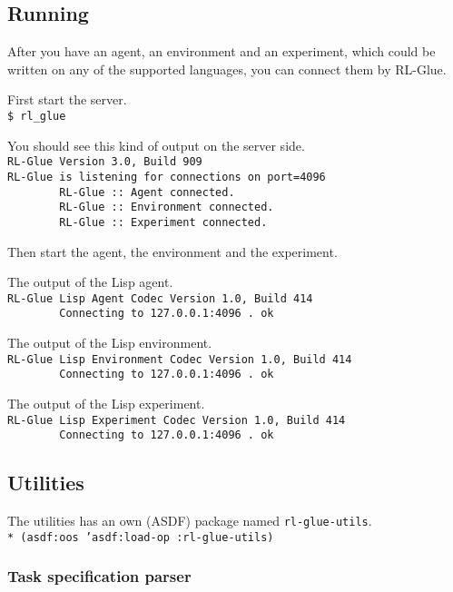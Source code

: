\documentclass[11pt,a4paper,dvipdfm]{article}
\newcommand{\prompttext}[1]{\texttt{#1}}
\newcommand{\shprompt}[1]{\prompttext{\$ #1}}
\newcommand{\lispprompt}[1]{\prompttext{* #1}}
\begin{document}
\subsection{Running}

After you have an agent, an environment and an experiment, which could be
written on any of the supported languages, you can connect them by RL-Glue.

First start the server. \\
\shprompt{rl\_glue}

You should see this kind of output on the server side. \\
\prompttext{RL-Glue Version 3.0, Build 909 \\
RL-Glue is listening for connections on port=4096 \\
\mbox{~~~~~~~~}RL-Glue ::~Agent connected. \\
\mbox{~~~~~~~~}RL-Glue ::~Environment connected. \\
\mbox{~~~~~~~~}RL-Glue ::~Experiment connected.}

Then start the agent, the environment and the experiment.

The output of the Lisp agent. \\
\prompttext{RL-Glue Lisp Agent Codec Version 1.0, Build 414 \\
\mbox{~~~~~~~~}Connecting to 127.0.0.1:4096 .~ok}

The output of the Lisp environment. \\
\prompttext{RL-Glue Lisp Environment Codec Version 1.0, Build 414 \\
\mbox{~~~~~~~~}Connecting to 127.0.0.1:4096 .~ok}

The output of the Lisp experiment. \\
\prompttext{RL-Glue Lisp Experiment Codec Version 1.0, Build 414 \\
\mbox{~~~~~~~~}Connecting to 127.0.0.1:4096 .~ok}

\subsection{Utilities}
\hypertarget{rlutils}{}

The utilities has an own (ASDF) package named \prompttext{rl-glue-utils}. \\
\lispprompt{(asdf:oos 'asdf:load-op :rl-glue-utils)}

\subsubsection{Task specification parser}
\end{document}
